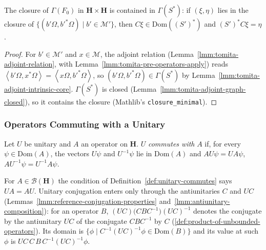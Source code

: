 \begin{lemma}
    \label{lmm:tomita-adjoint-extends-closure}
    \leanok
    The closure of $\Gamma(F_0)$ in $\mathbf{H} \times \mathbf{H}$ is contained in $\Gamma(S^*)$: if $(\xi, \eta)$ lies in the closure of $\{ (b'\Omega, b'^*\Omega) \mid b' \in \mathcal{M}' \}$, then $C\xi \in \text{Dom}((S')^*)$ and $(S')^*C\xi = \eta$.
\end{lemma}
\begin{proof}
    \leanok
    For $b' \in \mathcal{M}'$ and $x \in \mathcal{M}$, the adjoint relation (Lemma~\ref{lmm:tomita-adjoint-relation}, with Lemma~\ref{lmm:tomita-pre-operators-apply}) reads $\left< b'\Omega, x^*\Omega \right> = \left< x\Omega, b'^*\Omega \right>$, so $(b'\Omega, b'^*\Omega) \in \Gamma(S^*)$ by Lemma~\ref{lmm:tomita-adjoint-intrinsic-core}. $\Gamma(S^*)$ is closed (Lemma~\ref{lmm:tomita-adjoint-graph-closed}), so it contains the closure (Mathlib's \texttt{closure\_minimal}).
\end{proof}

\subsubsection{Operators Commuting with a Unitary}

\begin{definition}
    \label{def:unitary-commutes}
    \leanok
    Let $U$ be unitary and $A$ an operator on $\mathbf{H}$. $U$ \emph{commutes with} $A$ if, for every $\psi \in \text{Dom}(A)$, the vectors $U\psi$ and $U^{-1}\psi$ lie in $\text{Dom}(A)$ and $AU\psi = UA\psi$, $AU^{-1}\psi = U^{-1}A\psi$.
\end{definition}

For $A \in \mathcal{B}(\mathbf{H})$ the condition of Definition~\ref{def:unitary-commutes} says $UA = AU$. Unitary conjugation enters only through the antiunitaries $C$ and $UC$ (Lemmas~\ref{lmm:reference-conjugation-properties} and~\ref{lmm:antiunitary-composition}): for an operator $B$, $(UC)\big(CBC^{-1}\big)(UC)^{-1}$ denotes the conjugate by the antiunitary $UC$ of the conjugate $CBC^{-1}$ by $C$ (\ref{def:product-of-unbounded-operators}). Its domain is $\{ \phi \mid C^{-1}(UC)^{-1}\phi \in \text{Dom}(B) \}$ and its value at such $\phi$ is $UC\,C\,B\,C^{-1}(UC)^{-1}\phi$.

